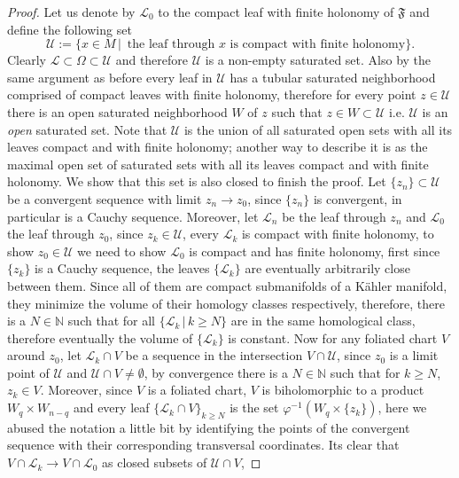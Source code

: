 \documentclass[12pt,twoside,a4paper]{report}
\newcommand{\nat}{\ensuremath{ \mathbb N }}
\begin{document}
\begin{proof}
  Let us denote by $\mathcal L_{0}$ to the compact leaf with finite holonomy of $\mathfrak F$ and define the following set
\[
    \mathcal{U}:=\{x\in M\,|\, \text{ the leaf through $x$ is compact with finite holonomy}\}.
\]
Clearly $\mathcal{L}\subset\Omega\subset\mathcal{U}$ and therefore $\mathcal{U}$ is a non-empty saturated set.
Also by the same argument as before every leaf in $\mathcal{U}$ has a tubular saturated neighborhood comprised of
compact leaves with finite holonomy, therefore for every point $z\in\mathcal{U}$ there is an open saturated
neighborhood $W$ of $z$ such that $z\in W\subset\mathcal{U}$ i.e. \(\mathcal{U}\) is an \emph{open} saturated set.
Note that $\mathcal{U}$ is the union of all saturated open sets with all its leaves compact and with finite holonomy;
another way to describe it is as the maximal open set of saturated sets with all its leaves compact and with finite holonomy.
We show that this set is also closed to finish the proof. Let $\{z_{n}\}\subset\mathcal{U}$ be a convergent sequence
with limit $z_{n}\rightarrow z_{0}$, since $\{z_{n}\}$ is convergent, in particular is a Cauchy sequence.
Moreover, let $\mathcal{L}_{n}$ be the leaf through $z_{n}$ and $\mathcal{L}_{0}$
the leaf through $z_{0}$, since $z_k\in\mathcal{U}$, every $\mathcal{L}_k$ is compact with finite holonomy, to show
$z_{0}\in\mathcal{U}$ we need to show $\mathcal{L}_{0}$ is compact and has finite holonomy, first since $\{z_{k}\}$ is a Cauchy
sequence, the leaves $\{\mathcal{L}_{k}\}$ are eventually arbitrarily close between them. Since all of them are compact
submanifolds of a Kähler manifold, they minimize the volume of their homology classes respectively, therefore, there is a
$N\in\nat$ such that for all \(\{\mathcal{L}_{k}\,|\,k\geq N\}\) are in the same homological class, therefore eventually the
volume of $\{\mathcal{L}_k\}$ is constant.
Now for any foliated chart $V$ around $z_{0}$, let $\mathcal{L}_{k}\cap V$ be a sequence in the intersection
$V\cap\mathcal{U}$, since $z_{0}$ is a limit point of $\mathcal{U}$ and $\mathcal{U}\cap V\neq\emptyset$, by convergence
there is a $N\in\nat$ such that for $k\geq N$, $z_k\in V$. Moreover, since $V$ is a foliated chart,
$V$ is biholomorphic to a product $W_q\times W_{n-q}$ and every leaf $\{\mathcal{L}_k\cap V\}_{k\geq N}$ is the set
$\varphi^{-1}(W_q\times\{z_k\})$, here we abused the notation a little bit by identifying the points of the
convergent sequence with their corresponding transversal coordinates.
Its clear that \hbox{$V\cap\mathcal{L}_{k}\rightarrow V\cap\mathcal{L}_{0}$} as closed subsets of $\mathcal{U}\cap V$,

\end{proof}
\end{document}
